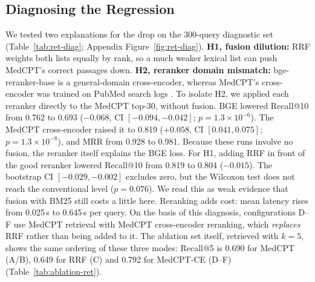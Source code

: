 \documentclass[11pt]{article}
\begin{document}
\subsection{Diagnosing the Regression}\label{sec:diag}
We tested two explanations for the drop on the 300-query diagnostic set (Table~\ref{tab:ret-diag}; Appendix Figure~\ref{fig:ret-diag}).
\textbf{H1, fusion dilution:} RRF weights both lists equally by rank, so a much weaker lexical list can push MedCPT's correct passages down.
\textbf{H2, reranker domain mismatch:} bge-reranker-base is a general-domain cross-encoder, whereas MedCPT's cross-encoder was trained on PubMed search logs \citep{jin2023medcpt}.
To isolate H2, we applied each reranker directly to the MedCPT top-30, without fusion. BGE lowered Recall@10 from 0.762 to 0.693 ($-0.068$, CI $[-0.094,-0.042]$; $p=1.3\times10^{-6}$). The MedCPT cross-encoder raised it to 0.819 ($+0.058$, CI $[0.041,0.075]$; $p=1.3\times10^{-8}$), and MRR from 0.928 to 0.981. Because these runs involve no fusion, the reranker itself explains the BGE loss. %
For H1, adding RRF in front of the good reranker lowered Recall@10 from 0.819 to 0.804 ($-0.015$). The bootstrap CI $[-0.029,-0.002]$ excludes zero, but the Wilcoxon test does not reach the conventional level ($p=0.076$). We read this as weak evidence that fusion with BM25 still costs a little here. %
Reranking adds cost: mean latency rises from 0.025\,s to 0.645\,s per query. %
On the basis of this diagnosis, configurations D--F use MedCPT retrieval with MedCPT cross-encoder reranking, which \emph{replaces} RRF rather than being added to it.
The ablation set itself, retrieved with $k=5$, shows the same ordering of these three modes: Recall@5 is 0.690 for MedCPT (A/B), 0.649 for RRF (C) and 0.792 for MedCPT-CE (D--F) (Table~\ref{tab:ablation-ret}). %

\begin{table}[t]
\centering\small
\setlength{\tabcolsep}{2.6pt}
\caption{Reranker diagnosis on the \textbf{diagnostic set} ($n=300$, the first 300 main-set queries; MedCPT values here differ from Table~\ref{tab:ret-main} because the query set differs). CE: MedCPT cross-encoder; BGE: bge-reranker-base; both rerank 30 candidates. Abbreviations as in Table~\ref{tab:ret-main}.} %
\label{tab:ret-diag}
\end{table}
\end{document}
